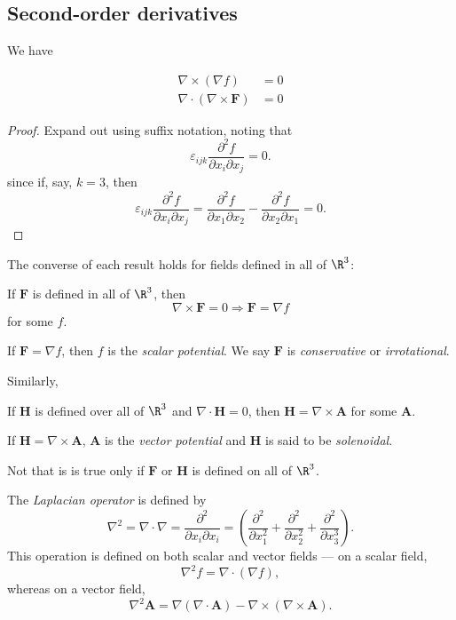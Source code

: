 \documentclass[a4paper]{article}
\begin{document}
\subsection{Second-order derivatives}
We have
\begin{prop}
  \begin{align*}
    \nabla\times (\nabla f) &= 0\\
    \nabla\cdot (\nabla\times \mathbf{F}) &=0
  \end{align*}
\end{prop}

\begin{proof}
  Expand out using suffix notation, noting that
  \[
    \varepsilon_{ijk}\frac{\partial^2 f}{\partial x_i \partial x_j} = 0.
  \]
  since if, say, $k = 3$, then
  \[
    \varepsilon_{ijk}\frac{\partial^2 f}{\partial x_i \partial x_j} = \frac{\partial^2 f}{\partial x_1 \partial x_2} - \frac{\partial^2 f}{\partial x_2 \partial x_1} = 0.
  \]

\end{proof}

The converse of each result holds for fields defined in all of $\R^3$:
\begin{prop}
  If $\mathbf{F}$ is defined in all of $\R^3$, then
  \[
    \nabla\times \mathbf{F} = 0 \Rightarrow \mathbf{F} = \nabla f
  \]
  for some $f$.
\end{prop}

\begin{defi}
  If $\mathbf{F} = \nabla f$, then $f$ is the \emph{scalar potential}. We say $\mathbf{F}$ is \emph{conservative} or \emph{irrotational}.
\end{defi}
Similarly,
\begin{prop}
  If $\mathbf{H}$ is defined over all of $\R^3$ and $\nabla\cdot \mathbf{H} = 0$, then $\mathbf{H} = \nabla \times \mathbf{A}$ for some $\mathbf{A}$.
\end{prop}

\begin{defi}
  If $\mathbf{H} = \nabla \times \mathbf{A}$, $\mathbf{A}$ is the \emph{vector potential} and $\mathbf{H}$ is said to be \emph{solenoidal}.
\end{defi}

Not that is is true only if $\mathbf{F}$ or $\mathbf{H}$ is defined on all of $\R^3$.

\begin{defi}
  The \emph{Laplacian operator} is defined by
  \[
    \nabla^2 = \nabla\cdot \nabla = \frac{\partial^2}{\partial x_i \partial x_i} = \left(\frac{\partial^2}{\partial x_1^2} + \frac{\partial^2}{\partial x_2^2} + \frac{\partial^2}{\partial x_3^3}\right).
  \]
  This operation is defined on both scalar and vector fields --- on a scalar field,
  \[
    \nabla^2 f = \nabla\cdot (\nabla f),
  \]
  whereas on a vector field,
  \[
    \nabla^2 \mathbf{A} = \nabla(\nabla\cdot \mathbf{A}) - \nabla\times (\nabla\times \mathbf{A}).
  \]
\end{defi}
\end{document}
